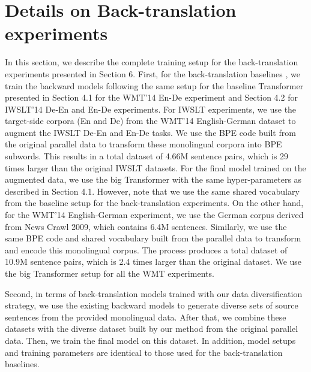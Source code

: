 \documentclass{article}
\begin{document}
\section{Details on Back-translation experiments}\label{app:back_translation}
In this section, we describe the complete training setup for the back-translation experiments presented in Section 6. First, for the back-translation baselines \citep{backtranslate_sennrich-etal-2016-improving}, we train the backward models following the same setup for the baseline Transformer presented in Section 4.1 for the WMT'14 En-De experiment and Section 4.2 for IWSLT'14 De-En and En-De experiments. For IWSLT experiments, we use the target-side corpora (En and De) from the WMT'14 English-German dataset to augment the IWSLT De-En and En-De tasks. We use the BPE code built from the original parallel data to transform these monolingual corpora into BPE subwords. This results in a total dataset of 4.66M sentence pairs, which is 29 times larger than the original IWSLT datasets. For the final model trained on the augmented data, we use the big Transformer with the same hyper-parameters as described in Section 4.1. However, note that we use the same shared vocabulary from the baseline setup for the back-translation experiments. On the other hand, for the WMT'14 English-German experiment, we use the German corpus derived from News Crawl 2009, which contains 6.4M sentences. Similarly, we use the same BPE code and shared vocabulary built from the parallel data to transform and encode this monolingual corpus. The process produces a total dataset of 10.9M sentence pairs, which is 2.4 times larger than the original dataset. We use the big Transformer setup for all the WMT experiments.

Second, in terms of back-translation models trained with our data diversification strategy, we use the existing  backward models to generate  diverse sets of source sentences from the provided monolingual data. After that, we combine these datasets with the diverse dataset built by our method from the original parallel data. Then, we train the final model on this dataset. In addition, model setups and training parameters are identical to those used for the back-translation baselines.



 
\end{document}
